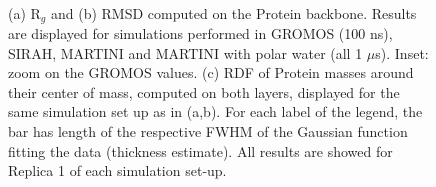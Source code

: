 \begin{figure}[p!]
\centering
{} 
 \\
\caption[Structural measures on buckyball in solution]{(a) R$_g$ and (b) RMSD computed on the Protein backbone. Results are displayed for simulations performed in GROMOS (100 ns), SIRAH, MARTINI and MARTINI with polar water (all 1 $\mu$s). Inset: zoom on the GROMOS values. (c) RDF of Protein masses around their center of mass, computed on both layers, displayed for the same simulation set up as in (a,b). For each label of the legend, the bar has length of the respective FWHM of the Gaussian function fitting the data (thickness estimate). All results are showed for Replica 1 of each simulation set-up.}
\label{fig:struct_UA_SIhere}
\end{figure}
%
